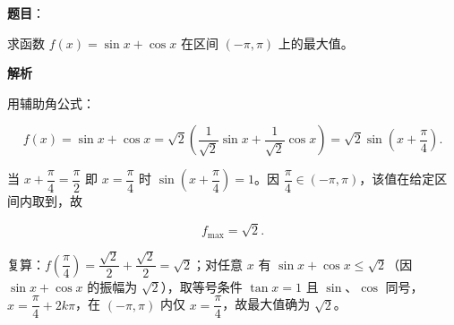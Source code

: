 \begin{answer}

\textbf{题目}：

求函数 $f(x)=\sin x+\cos x$ 在区间 $(-\pi,\pi)$ 上的最大值。

\textbf{解析}

用辅助角公式：

\nopagebreak[4]
\[
f(x)=\sin x+\cos x=\sqrt2\left(\frac1{\sqrt2}\sin x+\frac1{\sqrt2}\cos x\right)
=\sqrt2\sin\left(x+\frac\pi4\right).
\]

当 $x+\dfrac\pi4=\dfrac\pi2$ 即 $x=\dfrac\pi4$ 时 $\sin\left(x+\dfrac\pi4\right)=1$。因 $\dfrac\pi4\in(-\pi,\pi)$，该值在给定区间内取到，故

\nopagebreak[4]
\[
f_{\max}=\sqrt2.
\]

复算：$f\left(\dfrac\pi4\right)=\dfrac{\sqrt2}{2}+\dfrac{\sqrt2}{2}=\sqrt2$；对任意 $x$ 有 $\sin x+\cos x\leqslant\sqrt2$（因 $\sin x+\cos x$ 的振幅为 $\sqrt2$），取等号条件 $\tan x=1$ 且 $\sin$、$\cos$ 同号，$x=\dfrac\pi4+2k\pi$，在 $(-\pi,\pi)$ 内仅 $x=\dfrac\pi4$，故最大值确为 $\sqrt2$。


\end{answer}
